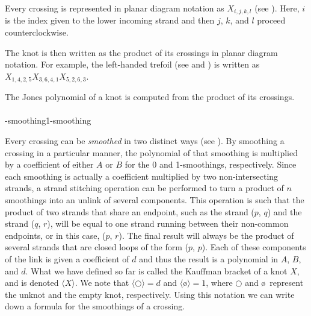 \begin{paper}

Every crossing is represented in planar diagram notation as $X_{i,j,k,l}$ (see
\figX).
Here, $i$ is the index given to the lower incoming strand and then $j$, $k$, and
$l$ proceed counterclockwise.

The knot is then written as the product of its crossings in planar diagram
notation.
For example, the left-handed trefoil (see \figTrefoil and \figLabeled) is
written as $X_{1,4,2,5}X_{3,6,4,1}X_{5,2,6,3}$.



The Jones polynomial of a knot is computed from the product of its crossings.\\

\hfill
{}\\

-smoothing\hfill 1-smoothing\\


Every crossing can be \textit{smoothed} in two distinct ways (see
\figSmoothings).
By smoothing a crossing in a particular manner, the polynomial of that smoothing
is multiplied by a coefficient of either $A$ or $B$ for the 0 and 1-smoothings,
respectively.
Since each smoothing is actually a coefficient multiplied by two
non-intersecting strands, a strand stitching operation can be performed to turn
a product of $n$ smoothings into an unlink of several components.
This operation is such that the product of two strands that share an endpoint,
such as the strand ($p$, $q$) and the strand ($q$, $r$), will be equal to one
strand running between their non-common endpoints, or in this case, ($p$, $r$).
The final result will always be the product of several strands that are closed
loops of the form ($p$, $p$).
Each of these components of the link is given a coefficient of $d$ and thus the
result is a polynomial in $A$, $B$, and $d$.
What we have defined so far is called the Kauffman bracket of a knot $X$, and is
denoted $\langle X\rangle$.
We note that $\langle\bigcirc\rangle=d$ and $\langle$\o$\rangle=1$, where
$\bigcirc$ and \o~represent the unknot and the empty knot, respectively.
Using this notation we can write down a formula for the smoothings of a
crossing.


\end{paper}
